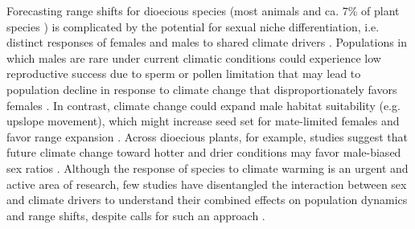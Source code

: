 \documentclass[9pt,twocolumn,twoside,lineno]{pnas-new}
\newcommand{\jacob}[2]{{\color{blue}{#1}}\footnote{\textit{\color{blue}{#2}}}}
\begin{document}
Forecasting range shifts for dioecious species (most animals and  ca. 7\% of plant species \citep{heilbuth2000lower}) is complicated by the potential for sexual niche differentiation, i.e. distinct responses of females and males to shared climate drivers \citep{hultine2016climate,morrison2016causes}. 
Populations in which males are rare under current climatic conditions could experience low reproductive success due to sperm or pollen limitation that may lead to population decline in response to climate change that disproportionately favors females \citep{eberhart2017sex}.
In contrast, climate change could expand male habitat suitability (e.g. upslope movement), which might increase seed set for mate-limited females and favor range expansion \citep{petry2016sex}. 
Across dioecious plants, for example, studies suggest that future climate change toward hotter and drier conditions may favor male-biased sex ratios \citep{field2013comparative,hultine2016climate}. 
Although the response of species to climate warming is an urgent and active area of research, few studies have disentangled the interaction between sex and climate drivers to understand their combined effects on population dynamics and range shifts, despite calls for such an approach \citep{hultine2016climate,gissi2023exploring}.
\end{document}
